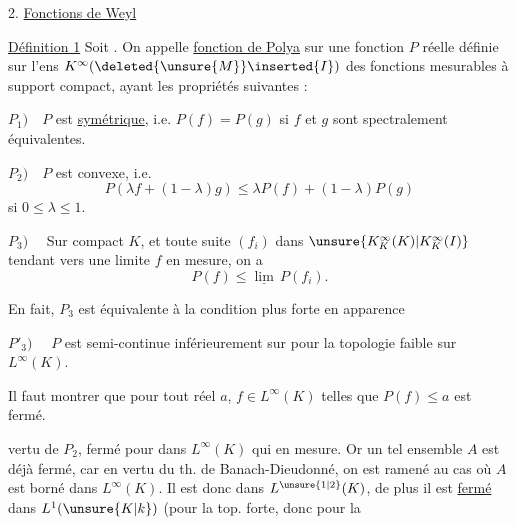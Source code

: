 2. \uline{Fonctions de Weyl}


\uline{Définition 1} Soit  \inserted{\(I=]0,\omega[\quad(0<\omega\le+\infty)\)}. On appelle \uline{fonction de Polya} sur  une fonction \(P\) réelle définie sur l'ens \(K^\infty(\deleted{\unsure{M}}\inserted{I})\) des fonctions mesurables à support compact, ayant les propriétés suivantes :


\(P_1)\quad P\) est \uline{symétrique}, i.e. \(P(f)=P(g)\) si \(f\) et \(g\) sont spectralement équivalentes.

\(P_2)\quad P\) est convexe, i.e.
\[
P(\lambda f+(1-\lambda)g)\le\lambda P(f)+(1-\lambda)P(g)
\]
si \(0\le\lambda\le1\).

\(P_3)\quad\) Sur  compact \(K\),  et toute suite \((f_i)\) dans \(\unsure{K^\infty_K(K)|K^\infty_K(I)}\) tendant vers une  limite \(f\) en mesure, on a
\[
P(f)\le\underline{\lim}\,P(f_i).
\]

En fait, \(P_3\) est équivalente à la condition plus forte en apparence

\(P'_3)\quad\)  \(P\) est semi-continue inférieurement sur  pour la topologie faible sur \(L^\infty(K)\).

Il faut montrer que pour tout réel \(a\), \deleted{\(\unsure{P^{-1}(]-\infty,a[)}\)}   \(f\in L^\infty(K)\) telles que \(P(f)\le a\) est  fermé.



 vertu de \(P_2\),   fermé pour  dans \(L^\infty(K)\) qui  en mesure. Or un tel ensemble \(A\) est déjà  fermé, car en vertu du th. de Banach-Dieudonné, on est ramené au cas où \(A\) est borné dans \(L^\infty(K)\). Il est donc  dans \(L^{\unsure{1|2}}(K)\),  de plus il est \uline{fermé} dans \(L^1(\unsure{K|k})\) (pour la top. forte, donc pour la

